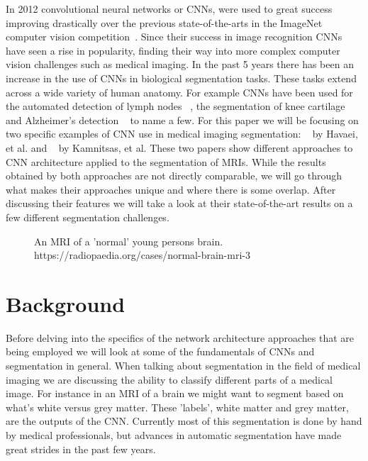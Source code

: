 \documentclass{sig-alternate}
\begin{document}
In 2012 convolutional neural networks or CNNs, were used to great success improving drastically over the previous state-of-the-arts in the ImageNet computer vision competition~\cite{NIPS:2012}. Since their success in image recognition CNNs have seen a rise in popularity, finding their way into more complex computer vision challenges such as medical imaging. In the past 5 years there has been an increase in the use of CNNs in biological segmentation tasks. These tasks extend across a wide variety of human anatomy. For example CNNs have been used for the automated detection of lymph nodes ~\cite{Roth:2014}, the segmentation of knee cartilage ~\cite{Prasoon:2013} and Alzheimer's detection ~\cite{Payan:2015} to name a few. For this paper we will be focusing on two specific examples of CNN use in medical imaging segmentation: ~\cite{Havaei:2017} by Havaei, et al. and ~\cite{Kamnitsas:2017} by Kamnitsas, et al. These two papers show different approaches to CNN architecture applied to the segmentation of MRIs. While the results obtained by both approaches are not directly comparable, we will go through what makes their approaches unique and where there is some overlap. After discussing their features we will take a look at their state-of-the-art results on a few different segmentation challenges.

\begin{figure}
\centering
{}
\caption{An MRI of a 'normal' young persons brain. https://radiopaedia.org/cases/normal-brain-mri-3}
\label{fig:brainMRI}
\end{figure}

\section{Background}
\label{sec:background}

Before delving into the specifics of the network architecture approaches that are being employed we will look at some of the fundamentals of CNNs and segmentation in general. When talking about segmentation in the field of medical imaging we are discussing the ability to classify different parts of a medical image. For instance in an MRI of a brain we might want to segment based on what's white versus grey matter. These 'labels', white matter and grey matter, are the outputs of the CNN. Currently most of this segmentation is done by hand by medical professionals, but advances in automatic segmentation have made great strides in the past few years. 
\end{document}

